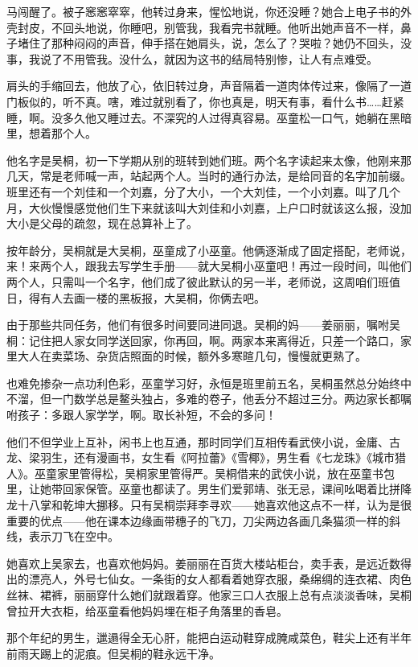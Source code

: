 \documentclass[lang=cn,newtx,12pt,scheme=chinese]{elegantbook}
\begin{document}
马闯醒了。被子窸窸窣窣，他转过身来，惺忪地说，你还没睡？她合上电子书的外壳封皮，不回头地说，你睡吧，别管我，我看完书就睡。他听出她声音不一样，鼻子堵住了那种闷闷的声音，伸手搭在她肩头，说，怎么了？哭啦？她仍不回头，没事，我说了不用管我。没什么，就因为这书的结局特别惨，让人有点难受。

肩头的手缩回去，他放了心，依旧转过身，声音隔着一道肉体传过来，像隔了一道门板似的，听不真。嗐，难过就别看了，你也真是，明天有事，看什么书……赶紧睡，啊。没多久他又睡过去。不深究的人过得真容易。巫童松一口气，她躺在黑暗里，想着那个人。

他名字是吴桐，初一下学期从别的班转到她们班。两个名字读起来太像，他刚来那几天，常是老师喊一声，站起两个人。当时的通行办法，是给同音的名字加前缀。班里还有一个刘佳和一个刘嘉，分了大小，一个大刘佳，一个小刘嘉。叫了几个月，大伙慢慢感觉他们生下来就该叫大刘佳和小刘嘉，上户口时就该这么报，没加大小是父母的疏忽，现在总算补上了。

按年龄分，吴桐就是大吴桐，巫童成了小巫童。他俩逐渐成了固定搭配，老师说，来！来两个人，跟我去写学生手册——就大吴桐小巫童吧！再过一段时间，叫他们两个人，只需叫一个名字，他们成了彼此默认的另一半，老师说，这周咱们班值日，得有人去画一楼的黑板报，大吴桐，你俩去吧。

由于那些共同任务，他们有很多时间要同进同退。吴桐的妈——姜丽丽，嘱咐吴桐：记住把人家女同学送回家，你再回，啊。两家本来离得近，只差一个路口，家里大人在卖菜场、杂货店照面的时候，额外多寒暄几句，慢慢就更熟了。

也难免掺杂一点功利色彩，巫童学习好，永恒是班里前五名，吴桐虽然总分始终中不溜，但一门数学总是鳌头独占，多难的卷子，他丢分不超过三分。两边家长都嘱咐孩子：多跟人家学学，啊。取长补短，不会的多问！

他们不但学业上互补，闲书上也互通，那时同学们互相传看武侠小说，金庸、古龙、梁羽生，还有漫画书，女生看《阿拉蕾》《雪椰》，男生看《七龙珠》《城市猎人》。巫童家里管得松，吴桐家里管得严。吴桐借来的武侠小说，放在巫童书包里，让她带回家保管。巫童也都读了。男生们爱郭靖、张无忌，课间吆喝着比拼降龙十八掌和乾坤大挪移。只有吴桐崇拜李寻欢——她喜欢他这点不一样，认为是很重要的优点——他在课本边缘画带穗子的飞刀，刀尖两边各画几条猫须一样的斜线，表示刀飞在空中。

她喜欢上吴家去，也喜欢他妈妈。姜丽丽在百货大楼站柜台，卖手表，是远近数得出的漂亮人，外号七仙女。一条街的女人都看着她穿衣服，桑绵绸的连衣裙、肉色丝袜、裙裤，丽丽穿什么她们就跟着穿。他家三口人衣服上总有点淡淡香味，吴桐曾拉开大衣柜，给巫童看他妈妈埋在柜子角落里的香皂。

那个年纪的男生，邋遢得全无心肝，能把白运动鞋穿成腌咸菜色，鞋尖上还有半年前雨天踢上的泥痕。但吴桐的鞋永远干净。
\end{document}
